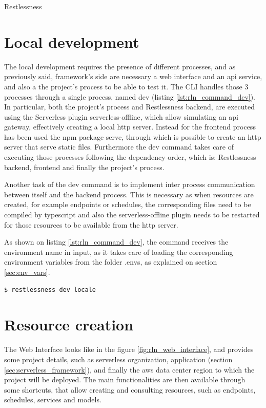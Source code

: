 \begin{chapter}{Restlessness}
    \section{Local development}
    \label{sec:local_dev}
    The local development requires the presence of different processes, and as
    previously said, framework's side are necessary a web interface and an api
    service, and also a the project's process to be able to test it.
    The CLI handles those 3 processes through a single process, named dev (listing
    \ref{lst:rln_command_dev}).
    In particular, both the project's process and Restlessness backend, are executed
    using the Serverless plugin serverless-offline, which allow simulating an api
    gateway, effectively creating a local http server.
    Instead for the frontend process has been used the npm package serve, through
    which is possible to create an http server that serve static files.
    Furthermore the dev command takes care of executing those processes following the
    dependency order, which is: Restlessness backend, frontend and finally the
    project's process.


    Another task of the dev command is to implement inter process communication between
    itself and the backend process. This is necessary as when resources are created,
    for example endpoints or schedules, the corresponding files need to be compiled by
    typescript and also the serverless-offline plugin needs to be restarted for those
    resources to be available from the http server.

    As shown on listing \ref{lst:rln_command_dev}, the command receives the environment
    name in input, as it takes care of loading the corresponding environment variables
    from the folder .envs, as explained on section \ref{sec:env_vars}.

    \begin{lstlisting}[caption=Dev command, label={lst:rln_command_dev}]
$ restlessness dev locale
    \end{lstlisting}

    \section{Resource creation}
    The Web Interface looks like in the figure \ref{fig:rln_web_interface}, and provides
    some project details, such as serverless organization, application (section
    \ref{sec:serverless_framework}), and finally the aws data center region to which
    the project will be deployed.
    The main functionalities are then available through some shortcuts, that allow
    creating and consulting resources, such as endpoints, schedules, services and models.


\end{chapter}
